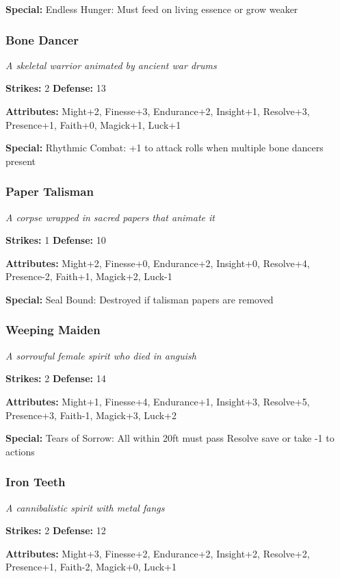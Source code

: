 \documentclass[10pt,twoside]{article}
\begin{document}
\textbf{Special:} Endless Hunger: Must feed on living essence or grow weaker

\subsubsection{Bone Dancer}
\textit{A skeletal warrior animated by ancient war drums}

\textbf{Strikes:} 2 \quad \textbf{Defense:} 13

\textbf{Attributes:} Might+2, Finesse+3, Endurance+2, Insight+1, Resolve+3, Presence+1, Faith+0, Magick+1, Luck+1

\textbf{Special:} Rhythmic Combat: +1 to attack rolls when multiple bone dancers present

\subsubsection{Paper Talisman}
\textit{A corpse wrapped in sacred papers that animate it}

\textbf{Strikes:} 1 \quad \textbf{Defense:} 10

\textbf{Attributes:} Might+2, Finesse+0, Endurance+2, Insight+0, Resolve+4, Presence-2, Faith+1, Magick+2, Luck-1

\textbf{Special:} Seal Bound: Destroyed if talisman papers are removed

\subsubsection{Weeping Maiden}
\textit{A sorrowful female spirit who died in anguish}

\textbf{Strikes:} 2 \quad \textbf{Defense:} 14

\textbf{Attributes:} Might+1, Finesse+4, Endurance+1, Insight+3, Resolve+5, Presence+3, Faith-1, Magick+3, Luck+2

\textbf{Special:} Tears of Sorrow: All within 20ft must pass Resolve save or take -1 to actions

\subsubsection{Iron Teeth}
\textit{A cannibalistic spirit with metal fangs}

\textbf{Strikes:} 2 \quad \textbf{Defense:} 12

\textbf{Attributes:} Might+3, Finesse+2, Endurance+2, Insight+2, Resolve+2, Presence+1, Faith-2, Magick+0, Luck+1
\end{document}
